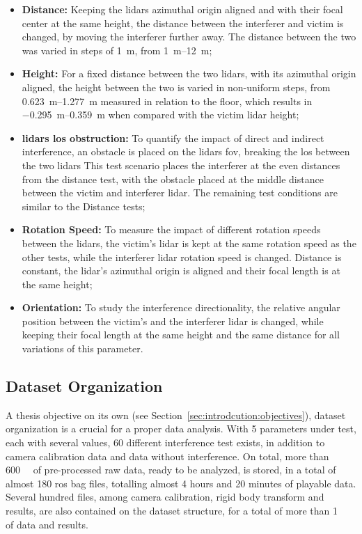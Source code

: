\begin{itemize}
\item \textbf{Distance:} Keeping the \acp{lidar} azimuthal origin aligned and with their focal center at the same height, the distance between the interferer and victim is changed, by moving the interferer further away. The distance between the two was varied in steps of \SI{1}{\meter}, from \SIrange{1}{12}{\meter};
\item \textbf{Height:} For a fixed distance between the two \acp{lidar}, with its azimuthal origin aligned, the height between the two is varied in non-uniform steps, from \SIrange{0.623}{1.277}{\meter} measured in relation to the floor, which results in \SIrange{-0.295}{0.359}{\meter} when compared with the victim \ac{lidar} height;
\item \textbf{\acp{lidar} \ac{los} obstruction:} To quantify the impact of direct and indirect interference, an obstacle is placed on the \acp{lidar} \ac{fov}, breaking the \ac{los} between the two \acp{lidar} This test scenario places the interferer at the even distances from the distance test, with the obstacle placed at the middle distance between the victim and interferer \ac{lidar}. The remaining test conditions are similar to the Distance tests;
\item \textbf{Rotation Speed:} To measure the impact of different rotation speeds between the \acp{lidar}, the victim's \ac{lidar} is kept at the same rotation speed as the other tests, while the interferer \ac{lidar} rotation speed is changed. Distance is constant, the \ac{lidar}'s azimuthal origin is aligned and their focal length is at the same height;
\item \textbf{Orientation:} To study the interference directionality, the relative angular position between the victim's and the interferer \ac{lidar} is changed, while keeping their focal length at the same height and the same distance for all variations of this parameter.
\end{itemize}


\subsection{Dataset Organization}
A thesis objective on its own (see Section~\ref{sec:introdcution:objectives}), dataset organization is a crucial for a proper data analysis. With 5 parameters under test, each with several values, 60 different interference test exists, in addition to camera calibration data and data without interference. On total, more than \SI{600}{\giga\byte} of pre-processed raw data, ready to be analyzed, is stored, in a total of almost 180 \ac{ros} bag files, totalling almost 4 hours and 20 minutes of playable data. Several hundred files, among camera calibration, rigid body transform and results, are also contained on the dataset structure, for a total of more than \SI{1}{\tera\byte} of data and results.

